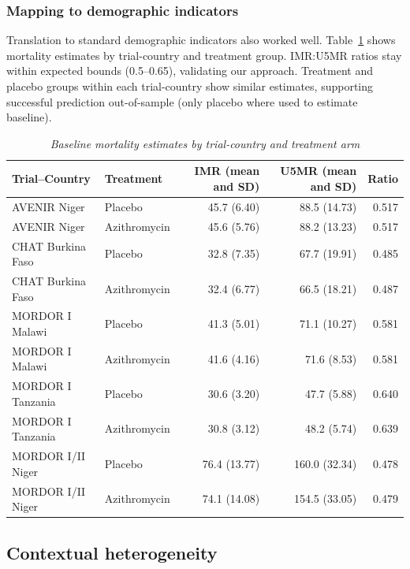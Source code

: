 \documentclass[11pt]{article}\usepackage[]{graphicx}\usepackage[]{xcolor}
\begin{document}
\subsubsection{Mapping to demographic indicators}

Translation to standard demographic indicators also worked well. Table~\ref{tab:agedem} shows mortality estimates by trial-country and treatment group. IMR:U5MR ratios stay within expected bounds (0.5--0.65), validating our approach. Treatment and placebo groups within each trial-country show similar estimates, supporting successful prediction out-of-sample (only placebo where used to estimate baseline).

\begin{table}[H]
\centering
\caption{\label{tab:age-decomp-table}\label{tab:agedem}\emph{Baseline mortality estimates by trial-country and treatment arm}}
\centering
\begin{tabular}[t]{llrrr}
\toprule
Trial--Country & Treatment & IMR (mean and SD) & U5MR (mean and SD) & Ratio\\
\midrule
AVENIR Niger & Placebo & 45.7 (6.40) & 88.5 (14.73) & 0.517\\
AVENIR Niger & Azithromycin & 45.6 (5.76) & 88.2 (13.23) & 0.517\\
\midrule
CHAT Burkina Faso & Placebo & 32.8 (7.35) & 67.7 (19.91) & 0.485\\
CHAT Burkina Faso & Azithromycin & 32.4 (6.77) & 66.5 (18.21) & 0.487\\
\midrule
MORDOR I Malawi & Placebo & 41.3 (5.01) & 71.1 (10.27) & 0.581\\
MORDOR I Malawi & Azithromycin & 41.6 (4.16) & 71.6 (8.53) & 0.581\\
\midrule
MORDOR I Tanzania & Placebo & 30.6 (3.20) & 47.7 (5.88) & 0.640\\
MORDOR I Tanzania & Azithromycin & 30.8 (3.12) & 48.2 (5.74) & 0.639\\
\midrule
MORDOR I/II Niger & Placebo & 76.4 (13.77) & 160.0 (32.34) & 0.478\\
MORDOR I/II Niger & Azithromycin & 74.1 (14.08) & 154.5 (33.05) & 0.479\\
\bottomrule
\end{tabular}
\end{table}



\subsection{Contextual heterogeneity}
\end{document}
